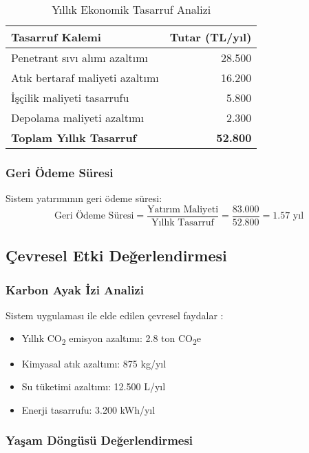 \documentclass[12pt,a4paper]{article}
\begin{document}
\begin{table}[H]
\centering
\caption{Yıllık Ekonomik Tasarruf Analizi}
\begin{tabular}{lr}
\toprule
\textbf{Tasarruf Kalemi} & \textbf{Tutar (TL/yıl)} \\
\midrule
Penetrant sıvı alımı azaltımı & 28.500 \\
Atık bertaraf maliyeti azaltımı & 16.200 \\
İşçilik maliyeti tasarrufu & 5.800 \\
Depolama maliyeti azaltımı & 2.300 \\
\textbf{Toplam Yıllık Tasarruf} & \textbf{52.800} \\
\bottomrule
\end{tabular}
\end{table}

\subsubsection{Geri Ödeme Süresi}

Sistem yatırımının geri ödeme süresi:
\[
\text{Geri Ödeme Süresi} = \frac{\text{Yatırım Maliyeti}}{\text{Yıllık Tasarruf}} = \frac{83.000}{52.800} = 1.57 \text{ yıl}
\]

\subsection{Çevresel Etki Değerlendirmesi}

\subsubsection{Karbon Ayak İzi Analizi}

Sistem uygulaması ile elde edilen çevresel faydalar \cite{carbon2021footprint, lee2020environmental}:

\begin{itemize}
\item Yıllık CO\textsubscript{2} emisyon azaltımı: 2.8 ton CO\textsubscript{2}e
\item Kimyasal atık azaltımı: 875 kg/yıl
\item Su tüketimi azaltımı: 12.500 L/yıl
\item Enerji tasarrufu: 3.200 kWh/yıl
\end{itemize}

\subsubsection{Yaşam Döngüsü Değerlendirmesi}
\end{document}
